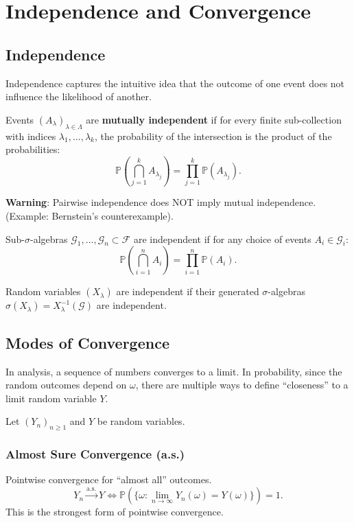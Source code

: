 \chapter{Independence and Convergence}

\section{Independence}

Independence captures the intuitive idea that the outcome of one event does not influence the likelihood of another.

\begin{definition}
Events $(A_{\lambda})_{\lambda \in \Lambda}$ are \textbf{mutually independent} if for every finite sub-collection with indices $\lambda_1, \dots, \lambda_k$, the probability of the intersection is the product of the probabilities:
\[
\mathbb{P}\left( \bigcap_{j=1}^k A_{\lambda_j} \right) = \prod_{j=1}^k \mathbb{P}(A_{\lambda_j}).
\]
\end{definition}
\textbf{Warning}: Pairwise independence does NOT imply mutual independence. (Example: Bernstein's counterexample).

\begin{definition}
Sub-$\sigma$-algebras $\mathcal{G}_1, \dots, \mathcal{G}_n \subset \mathcal{F}$ are independent if for any choice of events $A_i \in \mathcal{G}_i$:
\[
\mathbb{P}\left( \bigcap_{i=1}^n A_i \right) = \prod_{i=1}^n \mathbb{P}(A_i).
\]
\end{definition}

\begin{definition}
Random variables $(X_{\lambda})$ are independent if their generated $\sigma$-algebras $\sigma(X_{\lambda}) = X_{\lambda}^{-1}(\mathcal{G})$ are independent.
\end{definition}

\section{Modes of Convergence}
In analysis, a sequence of numbers converges to a limit. In probability, since the random outcomes depend on $\omega$, there are multiple ways to define ``closeness'' to a limit random variable $Y$.

Let $(Y_n)_{n \geq 1}$ and $Y$ be random variables.

\subsection{Almost Sure Convergence (a.s.)}
Pointwise convergence for ``almost all'' outcomes.
\[
Y_n \xrightarrow{\text{a.s.}} Y \iff \mathbb{P}\left( \{ \omega : \lim_{n \to \infty} Y_n(\omega) = Y(\omega) \} \right) = 1.
\]
This is the strongest form of pointwise convergence.

